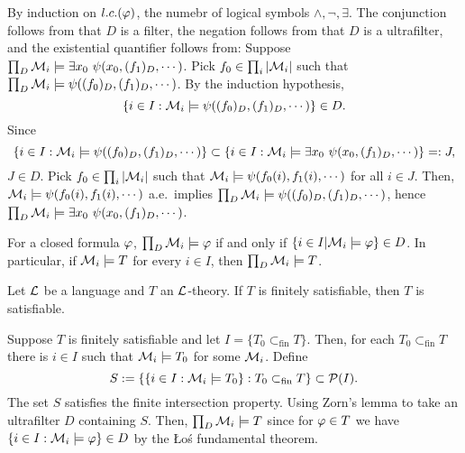 \documentclass{../../small}
\begin{document}
\begin{pf}
By induction on $l.c.(\varphi)$, the numebr of logical symbols $\wedge,\neg,\exists$.
The conjunction follows from that $D$ is a filter, the negation follows from that $D$ is a ultrafilter, and the existential quantifier follows from:
Suppose $\prod_D\cM_i\models\exists x_0\ \psi(x_0,(f_1)_D,\cdots)$.
Pick $f_0\in\prod_i|\mathcal{M}_i|$ such that $\prod_D\mathcal{M}_i\models\psi((f_0)_D,(f_1)_D,\cdots)$.
By the induction hypothesis,
\[\{i\in I:\mathcal{M}_i\models\psi((f_0)_D,(f_1)_D,\cdots)\}\in D.\]
Since
\[\{i\in I:\mathcal{M}_i\models\psi((f_0)_D,(f_1)_D,\cdots)\}\subset\{i\in I:\mathcal{M}_i\models\exists x_0\ \psi(x_0,(f_1)_D,\cdots)\}=:J,\]
$J\in D$.
Pick $f_0\in\prod_i|\mathcal{M}_i|$ such that $\mathcal{M}_i\models\psi(f_0(i),f_1(i),\cdots)$ for all $i\in J$.
Then, $\mathcal{M}_i\models\psi(f_0(i),f_1(i),\cdots)$ a.e.~implies $\prod_D\mathcal{M}_i\models\psi((f_0)_D,(f_1)_D,\cdots)$, hence $\prod_D\cM_i\models\exists x_0\ \psi(x_0,(f_1)_D,\cdots)$.
\end{pf}

\begin{cor*}
For a closed formula $\varphi$, $\prod_D\mathcal{M}_i\models\varphi$ if and only if $\{i\in I|\mathcal{M}_i\models\varphi\}\in D$.
In particular, if $\mathcal{M}_i\models T$ for every $i\in I$, then $\prod_D\mathcal{M}_i\models T$.
\end{cor*}


\begin{thm*}
Let $\mathcal{L}$ be a language and $T$ an $\mathcal{L}$-theory.
If $T$ is finitely satisfiable, then $T$ is satisfiable.
\end{thm*}
\begin{pf}
Suppose $T$ is finitely satisfiable and let $I=\{T_0\subset_{\mathrm{fin}}T\}$.
Then, for each $T_0\subset_{\mathrm{fin}}T$ there is $i\in I$ such that $\mathcal{M}_i\models T_0$ for some $\mathcal{M}_i$.
Define
\[S:=\{\{i\in I:\mathcal{M}_i\models T_0\}:T_0\subset_{\mathrm{fin}}T\}\subset\mathcal{P}(I).\]
The set $S$ satisfies the finite intersection property.
Using Zorn's lemma to take an ultrafilter $D$ containing $S$.
Then, $\prod_D\mathcal{M}_i\models T$ since for $\varphi\in T$ we have $\{i\in I:\mathcal{M}_i\models\varphi\}\in D$ by the \L o\'s fundamental theorem.
\end{pf}
\end{document}
